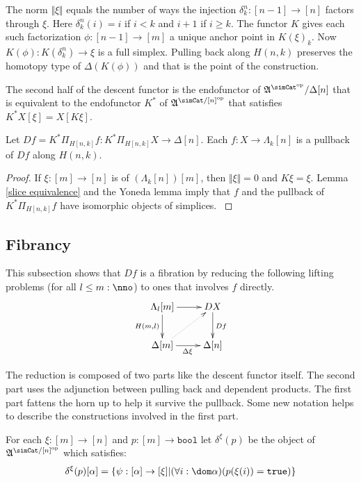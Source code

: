 \documentclass{tac}
\newcommand\set[1]{\left\{#1\right\}}
\newcommand\ri{^*}
\newcommand\dual{^{\mathrm{op}}}
\newcommand\s{^{\simCat\dual}}
\newcommand\of{:}
\newcommand\simplex\Delta
\newcommand\horn\Lambda
\newcommand\true{\mathtt{true}}
\newcommand\bool{\mathtt{bool}}
\newcommand\norm[1]{\Vert #1 \Vert}
\newcommand\depprod{\Pi_}
\newcommand\face\delta
\newcommand\ambient{\mathfrak A}
\begin{document}
The norm $\norm\xi$ equals the number of ways the injection $\delta^n_k\of[n-1]\to[n]$ factors through $\xi$. Here $\delta^n_k(i)=i$ if $i<k$ and $i+1$ if $i\geq k$. The functor $K$ gives each such factorization $\phi\of[n-1]\to [m]$ a unique anchor point in $K(\xi)_k$. Now $K(\phi)\of K(\delta^n_k)\to \xi$ is a full simplex. Pulling back along $H(n,k)$ preserves the homotopy type of $\Delta(K(\phi))$ and that is the point of the construction.

The second half of the descent functor is the endofunctor of $\ambient\s/\simplex[n]$ that is equivalent to the endofunctor $K\ri$ of $\ambient^{\simCat/[n]\dual}$ that satisfies $K\ri X[\xi] = X[K\xi]$.

\begin{lemma} Let $Df = K\ri\depprod{H[n,k]}f\of K\ri\depprod{H[n,k]}X\to\simplex[n]$. Each $f\of X\to\horn_k[n]$ is a pullback of $Df$ along $H(n,k)$. \end{lemma}

\begin{proof} If $\xi\of [m]\to[n]$ is of $(\horn_k[n])[m]$, then $\norm\xi=0$ and $K\xi = \xi$. Lemma \ref{slice equivalence} and the Yoneda lemma imply that $f$ and the pullback of $K\ri\depprod{H[n,k]}f$ have isomorphic objects of simplices. \label{descent pullback}
\end{proof}

\subsection{Fibrancy}
This subsection shows that $Df$ is a fibration by reducing the following lifting problems (for all $l\leq m\of\nno$) to ones that involves $f$ directly.
\begin{equation}
	\xymatrix{
		\horn_l[m]\ar[r]\ar[d]_{H(m,l)} & DX\ar[d]^{Df} \\
		\simplex[m]\ar[r]_{\Delta\xi} \ar@{.>}[ur] & \simplex[n]
	}
	\label{descent lifting problem}
\end{equation}

The reduction is composed of two parts like the descent functor itself. The second part uses the adjunction between pulling back and dependent products. The first part fattens the horn up to help it survive the pullback. Some new notation helps to describe the constructions involved in the first part.


\begin{definition} For each $\xi\of[m]\to[n]$ and $p\of[m]\to\bool$ let $\face^\xi(p)$ be the object of $\ambient^{\simCat/[n]\dual}$ which satisfies: 
\[ \face^\xi(p)[\alpha] = \set{\psi\of [\alpha]\to[\xi] | (\forall i\of \dom\alpha)(p(\xi(i))=\true)} \]
\end{definition}
\end{document}
